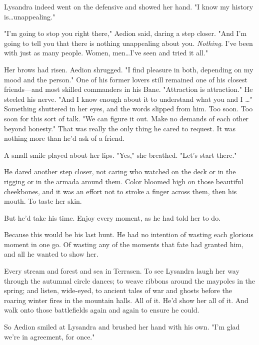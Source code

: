 Lysandra indeed went on the defensive and showed her hand.
"I know my history is\ldots unappealing."

"I'm going to stop you right there," Aedion said, daring a step closer.
"And I'm going to tell you that there is nothing unappealing about you.
\emph{Nothing}.
I've been with just as many people.
Women, men\ldots I've seen and tried it all."

Her brows had risen.
Aedion shrugged.
"I find pleasure in both, depending on my mood and the person."
One of his former lovers still remained one of his closest friends---and most skilled commanders in his Bane.
"Attraction is attraction."
He steeled his nerve.
"And I know enough about it to understand what you and I \ldots" Something shuttered in her eyes, and the words slipped from him.
Too soon.
Too soon for this sort of talk.
"We can figure it out.
Make no demands of each other beyond honesty."
That was really the only thing he cared to request.
It was nothing more than he'd ask of a friend.

A small smile played about her lips.
"Yes," she breathed.
"Let's start there."

He dared another step closer, not caring who watched on the deck or in the rigging or in the armada around them.
Color bloomed high on those beautiful cheekbones, and it was an effort not to stroke a finger across them, then his mouth.
To taste her skin.

But he'd take his time.
Enjoy every moment, as he had told her to do.

Because this would be his last hunt.
He had no intention of wasting each glorious moment in one go.
Of wasting any of the moments that fate had granted him, and all he wanted to show her.

Every stream and forest and sea in Terrasen.
To see Lysandra laugh her way through the autumnal circle dances; to weave ribbons around the maypoles in the spring; and listen, wide-eyed, to ancient tales of war and ghosts before the roaring winter fires in the mountain halls.
All of it.
He'd show her all of it.
And walk onto those battlefields again and again to ensure he could.

So Aedion smiled at Lysandra and brushed her hand with his own.
"I'm glad we're in agreement, for once."
